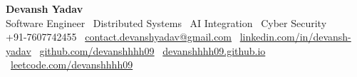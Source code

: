 \documentclass[letterpaper,10pt]{article}
\begin{document}
\fontsize{8.5pt}{10.5pt}\selectfont

\begin{center}
{\normalsize\textbf{Devansh Yadav}}\\[1pt]
\small Software Engineer \textbullet\ Distributed Systems \textbullet\ AI Integration \textbullet\ Cyber Security\\[1.5pt]
\small +91-7607742455 \textbar\
\href{mailto:contact.devanshyadav@gmail.com}{contact.devanshyadav@gmail.com} \textbar\
\href{https://linkedin.com/in/devansh-yadav-11209940b}{linkedin.com/in/devansh-yadav} \textbar\
\href{https://github.com/devanshhhh09}{github.com/devanshhhh09} \textbar\
\href{https://devanshhhh09.github.io}{devanshhhh09.github.io} \textbar\
\href{https://leetcode.com/u/devanshhhh09}{leetcode.com/devanshhhh09}
\end{center}
\vspace{-5pt}

\end{document}
